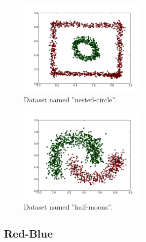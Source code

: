 \documentclass[conference]{IEEEtran}
\begin{document}
\begin{figure}[th]
\centering
\includegraphics[width=15pc]{circle-weird.pdf}
\caption{Dataset named ''nested-circle''.}
\label{dataset2}
\end{figure}

\begin{figure}[ht]
\centering
\includegraphics[width=15pc]{half-moons.pdf}
\caption{Dataset named ''half-moons''.}
\label{dataset3}
\end{figure}

\FloatBarrier


\subsection{Red-Blue}
\end{document}
